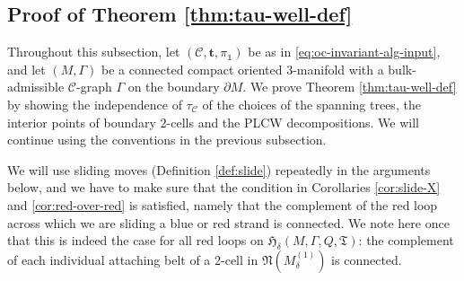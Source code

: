 \documentclass[11pt]{amsart}
\theoremstyle{definition}
\numberwithin{equation}{section}
\def\bd{{\partial}}
\def\mtr{{\mathbf{t}}} %
\def\nb{\mathfrak{N}}
\newcommand{\spnTree}{\fT}
\def\cC{\mathcal{C}}
\def\de{\delta}
\def\fH{\mathfrak{H}}
\def\fT{{\mathfrak{T}}}
\def\1{{\mathds{1}}}
\begin{document}
\subsection{Proof of Theorem \ref{thm:tau-well-def}}
Throughout this subsection, let $(\cC,\mtr,\pi_\1)$ be as in \eqref{eq:oc-invariant-alg-input}, and let $(M, \Gamma)$ be a connected compact oriented 3-manifold with a bulk-admissible $\cC$-graph $\Gamma$ on the boundary $\bd M$. 
We prove Theorem \ref{thm:tau-well-def} by showing the independence of $\tau_{\cC}$ of the choices of the spanning trees, the interior points of boundary 2-cells and the PLCW decompositions. We will continue using the conventions in the previous subsection. 

We will use sliding moves (Definition \ref{def:slide}) repeatedly in the arguments below, and we have to make sure that the condition in Corollaries \ref{cor:slide-X} and \ref{cor:red-over-red} is satisfied, namely that the complement of the red loop across which we are sliding a blue or red strand is connected. We note here once that this is indeed the case for all red loops on $\fH_{\de}(M, \Gamma, Q, \spnTree)$: the complement of each individual attaching belt of a 2-cell in $\nb(M^{(1)}_{\de})$ is connected.
\end{document}
